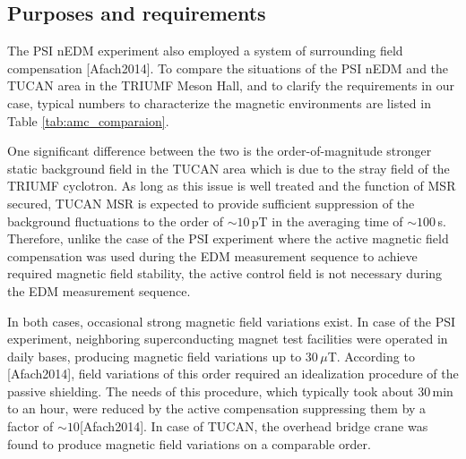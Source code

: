 


\subsection{Purposes and requirements}


The PSI nEDM experiment also employed a system of surrounding field compensation [Afach2014]. To compare the situations of the PSI nEDM and the TUCAN area in the TRIUMF Meson Hall, and to clarify the requirements in our case, typical numbers to characterize the magnetic environments are listed  in Table \ref{tab:amc_comparaion}. 

One significant difference between the two is the order-of-magnitude stronger static background field in the TUCAN area which is due to the stray field of the TRIUMF cyclotron. As long as this issue is well treated and the function of MSR secured, TUCAN MSR is expected to provide sufficient suppression of the background fluctuations to the order of $\sim10\,$pT in the averaging time of $\sim 100\,$s. 
Therefore, unlike the case of the PSI experiment where the active magnetic field compensation was used during the EDM measurement sequence to achieve required magnetic field stability, the active control field is not necessary during the EDM measurement sequence. 

In both cases, occasional strong magnetic field variations exist. In case of the PSI experiment, neighboring superconducting magnet test facilities were operated in daily bases,  producing magnetic field variations up to $30\,\mu$T. According to [Afach2014],  field variations of this order required an idealization procedure of the passive shielding. The needs of this procedure, which typically took about 30\,min to an hour, were reduced by the active compensation suppressing them by a factor of $\sim10 $[Afach2014]. In case of TUCAN, the overhead bridge crane was found to produce magnetic field variations on a comparable order. 

